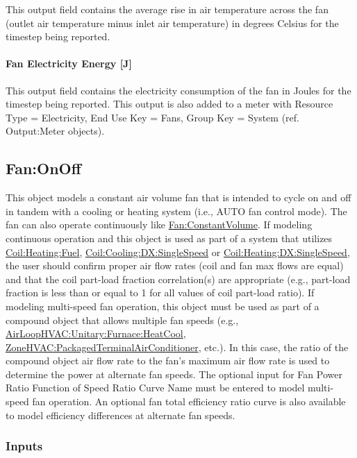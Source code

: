 This output field contains the average rise in air temperature across the fan (outlet air temperature minus inlet air temperature) in degrees Celsius for the timestep being reported.

\paragraph{Fan Electricity Energy {[}J{]}}\label{fan-electric-energy-j}

This output field contains the electricity consumption of the fan in Joules for the timestep being reported. This output is also added to a meter with Resource Type = Electricity, End Use Key = Fans, Group Key = System (ref. Output:Meter objects).

\subsection{Fan:OnOff}\label{fanonoff}

This object models a constant air volume fan that is intended to cycle on and off in tandem with a cooling or heating system (i.e., AUTO fan control mode). The fan can also operate continuously like \hyperref[fanconstantvolume]{Fan:ConstantVolume}. If modeling continuous operation and this object is used as part of a system that utilizes \hyperref[coilheatinggas-000]{Coil:Heating:Fuel}, \hyperref[coilcoolingdxsinglespeed]{Coil:Cooling:DX:SingleSpeed} or \hyperref[coilheatingdxsinglespeed]{Coil:Heating:DX:SingleSpeed}, the user should confirm proper air flow rates (coil and fan max flows are equal) and that the coil part-load fraction correlation(s) are appropriate (e.g., part-load fraction is less than or equal to 1 for all values of coil part-load ratio). If modeling multi-speed fan operation, this object must be used as part of a compound object that allows multiple fan speeds (e.g., \hyperref[airloophvacunitaryfurnaceheatcool]{AirLoopHVAC:Unitary:Furnace:HeatCool}, \hyperref[zonehvacpackagedterminalairconditioner]{ZoneHVAC:PackagedTerminalAirConditioner}, etc.). In this case, the ratio of the compound object air flow rate to the fan's maximum air flow rate is used to determine the power at alternate fan speeds. The optional input for Fan Power Ratio Function of Speed Ratio Curve Name must be entered to model multi-speed fan operation. An optional fan total efficiency ratio curve is also available to model efficiency differences at alternate fan speeds.

\subsubsection{Inputs}\label{inputs-1-017}

